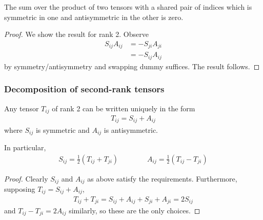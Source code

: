 \documentclass{../../template/note}
\begin{document}
    \begin{proposition*}
        The sum over the product of two tensors with a shared pair of indices which is symmetric in one and antisymmetric in the other is zero.
    \end{proposition*}
    
    \begin{proof}
        We show the result for rank 2. Observe
        \begin{align*}
            S_{ij}A_{ij} &= -S_{ji}A_{ji} \\
            &= -S_{ij}A_{ij}
        \end{align*}
        by symmetry/antisymmetry and swapping dummy suffices. The result follows.        
    \end{proof}
    
    \subsubsection{Decomposition of second-rank tensors}

    \begin{proposition}
        Any tensor \(T_{ij}\) of rank 2 can be written uniquely in the form
        \begin{align*}
            T_{ij} = S_{ij} + A_{ij}
        \end{align*}
        where \(S_{ij}\) is symmetric and \(A_{ij}\) is antisymmetric.
    \end{proposition}
    
    \begin{proposition}
        In particular,
        \begin{align*}
            S_{ij} = \frac 1 2\left(T_{ij} + T_{ji}\right) \qquad \qquad A_{ij} = \frac 1 2\left(T_{ij} - T_{ji}\right)
        \end{align*}
    \end{proposition}
    
    \begin{proof}
        Clearly \(S_{ij}\) and \(A_{ij}\) as above satisfy the requirements. Furthermore, supposing \(T_{ij} = S_{ij} + A_{ij}\), 
        \begin{align*}
            T_{ij} + T_{ji} = S_{ij} + A_{ij} + S_{ji} + A_{ji} = 2S_{ij}
        \end{align*}
        and \(T_{ij} - T_{ji} = 2A_{ij}\) similarly, so these are the only choices.        
    \end{proof}
    
\end{document}
